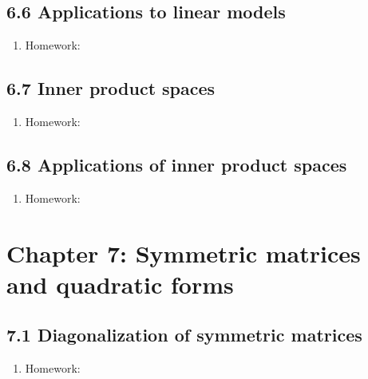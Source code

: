 \documentclass{article}
\begin{document}
\subsection{6.6 Applications to linear models}

\begin{enumerate}

\item Homework: 

\end{enumerate}

\subsection{6.7 Inner product spaces}

\begin{enumerate}

\item Homework: 

\end{enumerate}

\subsection{6.8 Applications of inner product spaces}

\begin{enumerate}

\item Homework: 

\end{enumerate}

\section{Chapter 7: Symmetric matrices and quadratic forms} 

\subsection{7.1 Diagonalization of symmetric matrices}

\begin{enumerate}

\item Homework: 

\end{enumerate}
\end{document}
